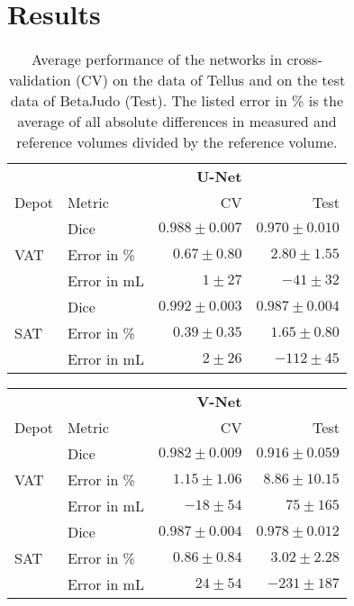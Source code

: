 \documentclass[10pt,letterpaper]{article}
\begin{document}
	\section*{Results}


	\begin{table}[H]
		\centering
		\caption{Average performance of the networks in cross-validation (CV) on the data of Tellus and on the test data of BetaJudo (Test). The listed error in \% is the average of all absolute differences in measured and reference volumes divided by the reference volume.}
		\vspace{0.5cm}
		\label{table_unet}
		\begin{tabular}{llrr}
			\hline
			& & \textbf{U-Net} &  \\
			Depot & Metric & CV & Test \\
			\hline
			& Dice & $0.988 \pm 0.007$ & $0.970 \pm 0.010$  \\
			VAT	& Error in \% & $0.67 \pm 0.80$ & $2.80 \pm 1.55$  \\
			& Error in mL & $1 \pm 27$ & $-41 \pm 32$ \\
			\hline
			& Dice & $0.992 \pm 0.003$ & $0.987 \pm 0.004$  \\
			SAT	& Error in \% & $0.39 \pm 0.35$ & $1.65 \pm 0.80$  \\
			& Error in mL & $2 \pm 26$ & $-112 \pm 45$ \\
			\hline
		\end{tabular}
	\end{table}

	\begin{table}[H]
		\centering

		\label{table_vnet}
		\begin{tabular}{llrr}
			\hline
			& & \textbf{V-Net} &  \\
			Depot & Metric & CV & Test \\
			\hline
			& Dice & $0.982 \pm 0.009$ & $0.916 \pm 0.059$  \\
			VAT	& Error in \% & $1.15 \pm 1.06$ & $8.86 \pm 10.15$ \\
			& Error in mL & $-18 \pm 54$ & $75 \pm 165$ \\
			\hline
			& Dice & $0.987 \pm 0.004$ & $0.978 \pm 0.012$ \\
			SAT	& Error in \% & $0.86 \pm 0.84$ & $3.02 \pm 2.28$  \\
			& Error in mL & $24 \pm 54$ & $-231 \pm 187$  \\
			\hline
		\end{tabular}
	\end{table}
\end{document}
